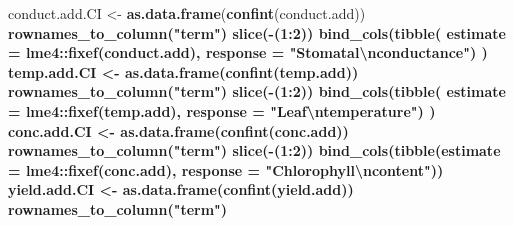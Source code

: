 \documentclass[]{scrartcl}
\newenvironment{Shaded}{\begin{snugshade}}{\end{snugshade}}
\newcommand{\CharTok}[1]{\textcolor[rgb]{0.31,0.60,0.02}{#1}}
\newcommand{\DataTypeTok}[1]{\textcolor[rgb]{0.13,0.29,0.53}{#1}}
\newcommand{\DecValTok}[1]{\textcolor[rgb]{0.00,0.00,0.81}{#1}}
\newcommand{\KeywordTok}[1]{\textcolor[rgb]{0.13,0.29,0.53}{\textbf{#1}}}
\newcommand{\NormalTok}[1]{#1}
\newcommand{\OperatorTok}[1]{\textcolor[rgb]{0.81,0.36,0.00}{\textbf{#1}}}
\newcommand{\StringTok}[1]{\textcolor[rgb]{0.31,0.60,0.02}{#1}}
\begin{document}
\begin{Shaded}
\begin{Highlighting}[]
{{{{{{{{{{{{{{{{{{{{{{{{{{{{{{{{{{{{{{{{{{{{{{{{{{{{{{{{{{{{{{        
\NormalTok{  conduct.add.CI <-}\StringTok{ }\KeywordTok{as.data.frame}\NormalTok{(}\KeywordTok{confint}\NormalTok{(conduct.add)) }\OperatorTok{%
\StringTok{                      }\KeywordTok{rownames_to_column}\NormalTok{(}\StringTok{"term"}\NormalTok{) }\OperatorTok{%
\StringTok{                        }\KeywordTok{slice}\NormalTok{(}\OperatorTok{-}\NormalTok{(}\DecValTok{1}\OperatorTok{:}\DecValTok{2}\NormalTok{)) }\OperatorTok{%
\StringTok{                    }\KeywordTok{bind_cols}\NormalTok{(}\KeywordTok{tibble}\NormalTok{(}
                                \DataTypeTok{estimate =}\NormalTok{ lme4}\OperatorTok{::}\KeywordTok{fixef}\NormalTok{(conduct.add), }
                                \DataTypeTok{response =} \StringTok{"Stomatal}\CharTok{\textbackslash{}n}\StringTok{conductance"}\NormalTok{) ) }
\NormalTok{  temp.add.CI <-}\StringTok{ }\KeywordTok{as.data.frame}\NormalTok{(}\KeywordTok{confint}\NormalTok{(temp.add)) }\OperatorTok{%
\StringTok{                      }\KeywordTok{rownames_to_column}\NormalTok{(}\StringTok{"term"}\NormalTok{) }\OperatorTok{%
\StringTok{                        }\KeywordTok{slice}\NormalTok{(}\OperatorTok{-}\NormalTok{(}\DecValTok{1}\OperatorTok{:}\DecValTok{2}\NormalTok{)) }\OperatorTok{%
\StringTok{                    }\KeywordTok{bind_cols}\NormalTok{(}\KeywordTok{tibble}\NormalTok{(}
                                \DataTypeTok{estimate =}\NormalTok{ lme4}\OperatorTok{::}\KeywordTok{fixef}\NormalTok{(temp.add), }
                                \DataTypeTok{response =} \StringTok{"Leaf}\CharTok{\textbackslash{}n}\StringTok{temperature"}\NormalTok{) ) }
\NormalTok{  conc.add.CI <-}\StringTok{ }\KeywordTok{as.data.frame}\NormalTok{(}\KeywordTok{confint}\NormalTok{(conc.add)) }\OperatorTok{%
\StringTok{                      }\KeywordTok{rownames_to_column}\NormalTok{(}\StringTok{"term"}\NormalTok{) }\OperatorTok{%
\StringTok{                        }\KeywordTok{slice}\NormalTok{(}\OperatorTok{-}\NormalTok{(}\DecValTok{1}\OperatorTok{:}\DecValTok{2}\NormalTok{)) }\OperatorTok{%
\StringTok{                 }\KeywordTok{bind_cols}\NormalTok{(}\KeywordTok{tibble}\NormalTok{(}\DataTypeTok{estimate =}\NormalTok{ lme4}\OperatorTok{::}\KeywordTok{fixef}\NormalTok{(conc.add), }
                                  \DataTypeTok{response =} \StringTok{"Chlorophyll}\CharTok{\textbackslash{}n}\StringTok{content"}\NormalTok{))}
\NormalTok{  yield.add.CI <-}\StringTok{ }\KeywordTok{as.data.frame}\NormalTok{(}\KeywordTok{confint}\NormalTok{(yield.add)) }\OperatorTok{%
\StringTok{                      }\KeywordTok{rownames_to_column}\NormalTok{(}\StringTok{"term"}\NormalTok{) }\OperatorTok{%
}}}}}}}}}}}}}}}}}}}}}}}}}}}}}}}}}}}}}}}}}}}}}}}}}}}}}}}}}}}}}}}}}}}}}}}}}
\end{Highlighting}
\end{Shaded}
\end{document}
